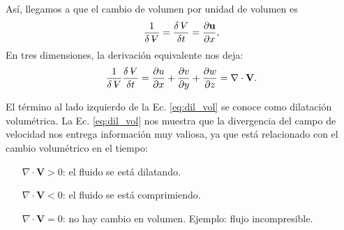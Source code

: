 %
Así, llegamos a que el cambio de volumen por unidad de volumen es
%
\begin{equation}
\frac{1}{\delta \vol} = \frac{\delta \vol}{\delta t} = \frac{\partial \mathbf{u}}{\partial x},
\end{equation}
%
En tres dimensiones, la derivación equivalente nos deja:
%
\begin{equation}\label{eq:dil_vol} 
\frac{1}{\delta \vol}\frac{\delta \vol}{\delta t} = \frac{\partial u}{\partial x} +\frac{\partial v}{\partial y} +\frac{\partial w}{\partial z}  = \nabla \cdot \mathbf{V}.
\end{equation}

El término al lado izquierdo de la Ec. \eqref{eq:dil_vol} se conoce como dilatación volumétrica.
La Ec. \eqref{eq:dil_vol} nos muestra que la divergencia del campo de velocidad nos entrega información muy valiosa, ya que está relacionado con el cambio volumétrico en el tiempo:
%
\begin{itemize}
\item[$\nabla \cdot \mathbf{V} > 0$:] el fluido se está dilatando. 
\item[$\nabla \cdot \mathbf{V} < 0$:] el fluido se está comprimiendo. 
\item[$\nabla \cdot \mathbf{V} = 0$:] no hay cambio en volumen. Ejemplo: flujo incompresible. 
\end{itemize}


